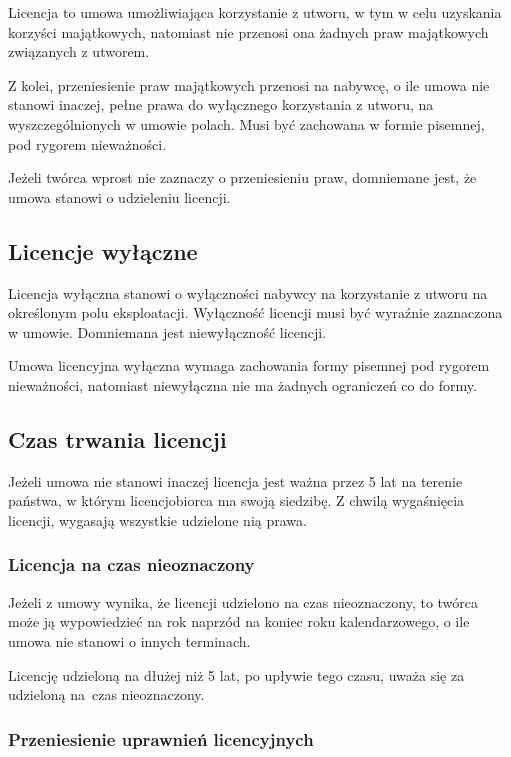 \documentclass{article}
\begin{document}
Licencja to umowa umożliwiająca korzystanie z utworu, w tym w celu uzyskania korzyści majątkowych, natomiast nie przenosi ona żadnych praw majątkowych związanych z utworem.

Z kolei, przeniesienie praw majątkowych przenosi na nabywcę, o ile umowa nie stanowi inaczej, pełne prawa do wyłącznego korzystania z utworu, na wyszczególnionych w umowie polach. Musi być zachowana w formie pisemnej, pod rygorem nieważności.

Jeżeli twórca wprost nie zaznaczy o przeniesieniu praw, domniemane jest, że umowa stanowi o udzieleniu licencji.

\subsection{Licencje wyłączne}

Licencja wyłączna stanowi o wyłączności nabywcy na korzystanie z utworu na określonym polu eksploatacji. Wyłączność licencji musi być wyraźnie zaznaczona w umowie. Domniemana jest niewyłączność licencji.

Umowa licencyjna wyłączna wymaga zachowania formy pisemnej pod rygorem nieważności, natomiast niewyłączna nie ma żadnych ograniczeń co do formy.

\subsection{Czas trwania licencji}

Jeżeli umowa nie stanowi inaczej licencja jest ważna przez 5 lat na terenie państwa, w którym licencjobiorca ma swoją siedzibę. Z chwilą wygaśnięcia licencji, wygasają wszystkie udzielone nią prawa.

\subsubsection{Licencja na czas nieoznaczony}

Jeżeli z umowy wynika, że licencji udzielono na czas nieoznaczony, to twórca może ją wypowiedzieć na rok naprzód na koniec roku kalendarzowego, o ile umowa nie stanowi o innych terminach.

Licencję udzieloną na dłużej niż 5 lat, po upływie tego czasu, uważa się za udzieloną na~czas nieoznaczony.

\subsubsection{Przeniesienie uprawnień licencyjnych}
\end{document}
